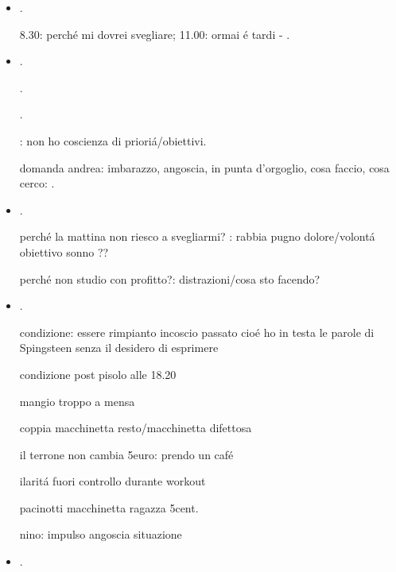 \begin{itemize}
\item {}.

8.30: perch\'e mi dovrei svegliare; 11.00: ormai \'e tardi -  .


\item {}.

.

.

: non ho coscienza di priori\'a/obiettivi.

domanda andrea: imbarazzo, angoscia, in punta d'orgoglio, cosa faccio, cosa cerco: .

\item {}.

perch\'e la mattina non riesco a svegliarmi? : rabbia pugno dolore/volont\'a obiettivo sonno ?? 

perch\'e non studio con profitto?: distrazioni/cosa sto facendo?

\item {}.

condizione: essere  rimpianto incoscio passato cio\'e ho in testa le parole di Spingsteen senza il desidero di esprimere

condizione post pisolo alle 18.20

mangio troppo a mensa

coppia macchinetta resto/macchinetta difettosa

il terrone non cambia 5euro: prendo un caf\'e

ilarit\'a fuori controllo durante workout

pacinotti macchinetta ragazza 5cent.

nino: impulso angoscia situazione

\item {}.



\end{itemize}
